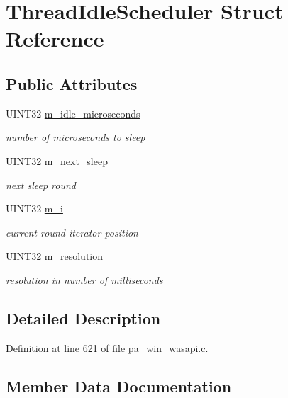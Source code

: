 \hypertarget{struct_thread_idle_scheduler}{}\section{Thread\+Idle\+Scheduler Struct Reference}
\label{struct_thread_idle_scheduler}
\subsection*{Public Attributes}
\begin{DoxyCompactItemize}
\item 
U\+I\+N\+T32 \hyperlink{struct_thread_idle_scheduler_a26bd9b0fcd08da6394b1b0a577b69536}{m\+\_\+idle\+\_\+microseconds}
\begin{DoxyCompactList}\small\item\em number of microseconds to sleep \end{DoxyCompactList}\item 
U\+I\+N\+T32 \hyperlink{struct_thread_idle_scheduler_aa54f62fb37734538f6750a0a751e3339}{m\+\_\+next\+\_\+sleep}
\begin{DoxyCompactList}\small\item\em next sleep round \end{DoxyCompactList}\item 
U\+I\+N\+T32 \hyperlink{struct_thread_idle_scheduler_ab2c6c2a4a836798d7bfc33c70be3582b}{m\+\_\+i}
\begin{DoxyCompactList}\small\item\em current round iterator position \end{DoxyCompactList}\item 
U\+I\+N\+T32 \hyperlink{struct_thread_idle_scheduler_ad82606350adc83e95aea1527bd8926c3}{m\+\_\+resolution}
\begin{DoxyCompactList}\small\item\em resolution in number of milliseconds \end{DoxyCompactList}\end{DoxyCompactItemize}


\subsection{Detailed Description}


Definition at line 621 of file pa\+\_\+win\+\_\+wasapi.\+c.



\subsection{Member Data Documentation}
